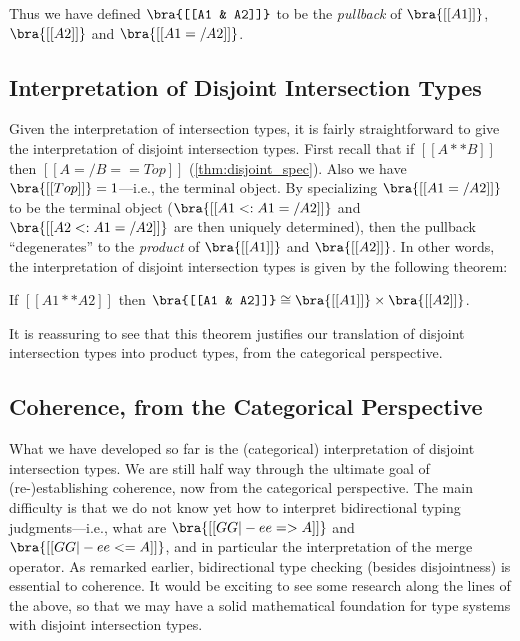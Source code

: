 Thus we have defined $\bra{[[A1 & A2]]}$ to be the \emph{pullback} of
$\bra{[[A1]]}$, $\bra{[[A2]]}$ and $\bra{[[A1 =/ A2]]}$.

\subsection{Interpretation of Disjoint Intersection Types}

Given the interpretation of intersection types, it is fairly straightforward to
give the interpretation of disjoint intersection types. First recall that if
$[[A ** B]]$ then $[[ A =/ B == Top ]]$ (\cref{thm:disjoint_spec}). Also we have
$\bra{[[Top]]} = 1$---i.e., the terminal object. By specializing $\bra{[[A1 =/ A2]]}$ to be the terminal object
($\bra{[[A1 <: A1 =/ A2]]}$ and $\bra{[[A2 <: A1 =/ A2]]}$ are then uniquely
determined), then the pullback ``degenerates'' to the \emph{product} of
$\bra{[[A1]]}$ and $\bra{[[A2]]}$. In other words, the interpretation of
disjoint intersection types is given by the following theorem:
\begin{theorem}
  If $[[A1 ** A2]]$ then $\bra{[[A1 & A2]]} \cong \bra{[[A1]]} \times \bra{[[A2]]} $.
\end{theorem}
\begin{remark}
It is reassuring to see that this theorem justifies our translation of
disjoint intersection types into product types, from the categorical
perspective.
\end{remark}



\subsection{Coherence, from the Categorical Perspective}

What we have developed so far is the (categorical) interpretation of disjoint intersection
types. We are still half way through the ultimate goal of (re-)establishing
coherence, now from the categorical perspective. The main difficulty is that we
do not know yet how to interpret bidirectional typing judgments---i.e., what are
$\bra{[[GG |- ee => A]]}$ and $\bra{[[GG |- ee <= A]]}$, and in particular the
interpretation of the merge operator. As remarked earlier, bidirectional type checking
(besides disjointness) is essential to coherence. It would be exciting to see
some research along the lines of the above, so that we may have a solid
mathematical foundation for type systems with disjoint intersection types.

